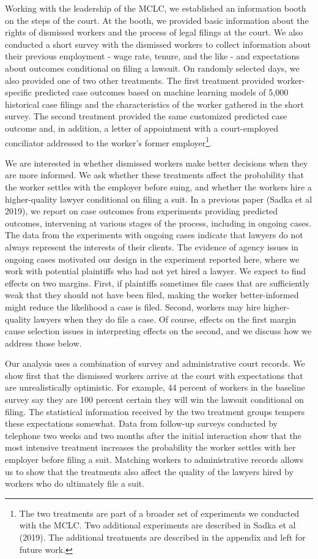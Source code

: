\documentclass[oneside,12pt]{article}
\begin{document}
Working with the leadership of the MCLC, we established an information booth on the steps of the court. At the booth, we provided basic information about the rights of dismissed workers and the process of legal filings at the court. We also conducted a short survey with the dismissed workers to collect information about their previous employment - wage rate, tenure, and the like - and expectations about outcomes conditional on filing a lawsuit. On randomly selected days, we also provided one of two other treatments. The first treatment provided worker-specific predicted case outcomes based on machine learning models of 5,000 historical case filings and the characteristics of the worker gathered in the short survey. The second treatment provided the same customized predicted case outcome and, in addition, a letter of appointment with a court-employed conciliator addressed to the worker’s former employer\footnote{The two treatments are part of a broader set of experiments we conducted with the MCLC. Two additional experiments are described in Sadka et al (2019). The additional treatments are described in the appendix and left for future work.}. 

We are interested in whether dismissed workers make better decisions when they are more informed. We ask whether these treatments affect the probability that the worker settles with the employer before suing, and whether the workers hire a higher-quality lawyer conditional on filing a suit. In a previous paper (Sadka et al 2019), we report on case outcomes from experiments providing predicted outcomes, intervening at various stages of the process, including in ongoing cases. The data from the experiments with ongoing cases indicate that lawyers do not always represent the interests of their clients. The evidence of agency issues in ongoing cases motivated our design in the experiment reported here, where we work with potential plaintiffs who had not yet hired a lawyer. We expect to find effects on two margins. First, if plaintiffs sometimes file cases that are sufficiently weak that they should not have been filed, making the worker better-informed might reduce the likelihood a case is filed. Second, workers may hire higher-quality lawyers when they do file a case. Of course, effects on the first margin cause selection issues in interpreting effects on the second, and we discuss how we address those below.  

Our analysis uses a combination of survey and administrative court records. We show first that the dismissed workers arrive at the court with expectations that are unrealistically optimistic. For example, 44 percent of workers in the baseline survey say they are 100 percent certain they will win the lawsuit conditional on filing. The statistical information received by the two treatment groups tempers these expectations somewhat. Data from follow-up surveys conducted by telephone two weeks and two months after the initial interaction show that the most intensive treatment increases the probability the worker settles with her employer before filing a suit. Matching workers to administrative records allows us to show that the treatments also affect the quality of the lawyers hired by workers who do ultimately file a suit. 
\end{document}
